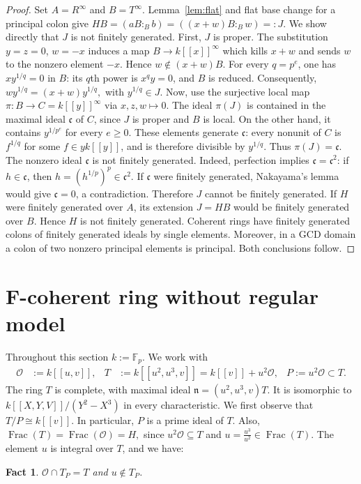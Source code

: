 \documentclass[11pt,a4paper]{amsart}
\numberwithin{equation}{section}
\newtheorem{fact}[theorem]{Fact}\newtheorem{claim}[theorem]{Claim}
\newcommand{\n}{\mathfrak n}
\newcommand{\F}{\mathbb F}
\begin{document}
 \begin{proof}	Set $A=R^\infty$ and $B=T^\infty$. Lemma~\ref{lem:flat} and	flat base change for a principal colon give 	$	HB=(aB:_B b)=((x+w)B:_B w)=:J.$	We show directly that $J$ is not finitely generated.	First, $J$ is proper. The substitution $y=z=0$, $w=-x$ induces 	a map $B\to k[[x]]^\infty$ which kills $x+w$ and sends $w$ to 	the nonzero element $-x$. Hence $w\notin(x+w)B$.	For every $q=p^e$, one has $xy^{1/q}=0$ in $B$: its $q$th power	is $x^qy=0$, and $B$ is reduced. Consequently,	$wy^{1/q}=(x+w)y^{1/q},$ 	with $y^{1/q}\in J.	$	Now, use the surjective local map	$\pi:B\longrightarrow C=k[[y]]^\infty$ via $ x,z,w\longmapsto0.$	The ideal $\pi(J)$ is contained in the maximal ideal $\mathfrak c$	of $C$, since $J$ is proper and $B$ is local. On the other hand,	it contains $y^{1/p^e}$ for every $e\geq0$. These elements	generate $\mathfrak c$: every nonunit of $C$ is $f^{1/q}$ for	some $f\in yk[[y]]$, and is therefore divisible by $y^{1/q}$.	Thus
 $\pi(J)=\mathfrak c.$	The nonzero ideal $\mathfrak c$ is not finitely generated.	Indeed, perfection implies	$\mathfrak c=\mathfrak c^2$: if $h\in\mathfrak c$, then	$h=(h^{1/p})^p\in\mathfrak c^2$. If $\mathfrak c$ were finitely	generated, Nakayama's lemma would give $\mathfrak c=0$, a	contradiction. Therefore $J$ cannot be finitely generated.
 If $H$ were finitely generated over $A$, its extension $J=HB$	would be finitely generated over $B$. Hence $H$ is not finitely	generated. Coherent rings have finitely generated colons of	finitely generated ideals by single elements. Moreover, in a	GCD domain a colon of two nonzero principal elements is principal.	Both conclusions follow.
 \end{proof}
 


 	
\section{F-coherent ring without regular model}
Throughout this section $k:=\F_p$. We work with
$$\begin{aligned}
\mathcal{O}&:=k[[u,v]], & T&:=k[[u^2,u^3,v]]=k[[v]]+u^2	\mathcal{O},
&P:=u^2	\mathcal{O}\subset T.
\end{aligned}
$$ 
 The ring $T$ is complete, with maximal ideal
$\n=(u^2,u^3,v)T$. It is isomorphic to
$k[[X,Y,V]]/(Y^2-X^3)$ in every characteristic.
We first observe that
$T/P\cong k[[v]].$
In particular, $P$ is a prime ideal of $T$. Also,
\(
\operatorname{Frac}(T)=\operatorname{Frac}(\mathcal O)=H,
\)
since $u^2\mathcal O\subseteq T$ and
$u=\frac{u^3}{u^2}\in\operatorname{Frac}(T).$
The element $u$ is integral over $T$, and we have:
\begin{fact}\label{eq:cusp}
$\mathcal{O}\cap T_P=T$ and $ u\notin T_P$.
 	\end{fact}
\end{document}
